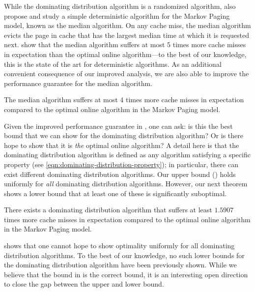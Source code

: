 While the dominating distribution algorithm is a randomized algorithm, \cite{lund1994ip} also propose and study a simple deterministic algorithm for the Markov Paging model, known as the median algorithm. On any cache miss, the median algorithm evicts the page in cache that has the largest median time at which it is requested next. \cite{lund1994ip} show that the median algorithm suffers at most 5 times more cache misses in expectation than the optimal online algorithm---to the best of our knowledge, this is the state of the art for deterministic algorithms. As an additional convenient consequence of our improved analysis, we are also able to improve the performance guarantee for the median algorithm.

\begin{theorem}
    \label{thm:median-improved-bound}
    The median algorithm suffers at most 4 times more cache misses in expectation compared to the optimal online algorithm in the Markov Paging model.
\end{theorem}

Given the improved performance guarantee in , one can ask: is this the best bound that we can show for the dominating distribution algorithm? Or is there hope to show that it is \textit{the} optimal online algorithm? A detail here is that the dominating distribution algorithm is defined as any algorithm satisfying a specific property (see \eqref{eqn:dominating-distribution-property}); in particular, there can exist different dominating distribution algorithms. Our upper bound () holds uniformly for \textit{all} dominating distribution algorithms. However, our next theorem shows a lower bound that at least one of these is significantly suboptimal. 

\begin{theorem}
    \label{thm:dominating-distribution-lower-bound}
    There exists a dominating distribution algorithm that suffers at least $1.5907$ times more cache misses in expectation compared to the optimal online algorithm in the Markov Paging model.
\end{theorem}

 shows that one cannot hope to show optimality uniformly for all dominating distribution algorithms. To the best of our knowledge, no such lower bounds for the dominating distribution algorithm have been previously shown. While we believe that the bound in  is the correct bound, it is an interesting open direction to close the gap between the upper and lower bound. %

